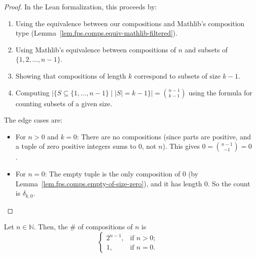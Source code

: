 \begin{proof}
In the Lean formalization, this proceeds by:
\begin{enumerate}
\item Using the equivalence between our compositions and Mathlib's
composition type (Lemma~\ref{lem.fps.comps.equiv-mathlib-filtered}).
\item Using Mathlib's equivalence between compositions of $n$ and subsets of
$\{1, 2, \ldots, n-1\}$.
\item Showing that compositions of length $k$ correspond to subsets of size $k-1$.
\item Computing $|\{S \subseteq \{1, \ldots, n-1\} \mid |S| = k-1\}| = \binom{n-1}{k-1}$
using the formula for counting subsets of a given size.
\end{enumerate}

The edge cases are:
\begin{itemize}
\item For $n > 0$ and $k = 0$: There are no compositions (since parts are positive,
and a tuple of zero positive integers sums to $0$, not $n$). This gives $0 = \binom{n-1}{-1} = 0$.
\item For $n = 0$: The empty tuple is the only composition of $0$ (by
Lemma~\ref{lem.fps.comps.empty-of-size-zero}), and it has length $0$.
So the count is $\delta_{k,0}$.
\end{itemize}
\end{proof}

\begin{theorem}
\label{thm.fps.comps.num-comps-n}
\leantarget
\leanok
Let $n\in\mathbb{N}$. Then, the \# of
compositions of $n$ is%
\[%
\begin{cases}
2^{n-1}, & \text{if }n>0;\\
1, & \text{if }n=0.
\end{cases}
\]
\end{theorem}

